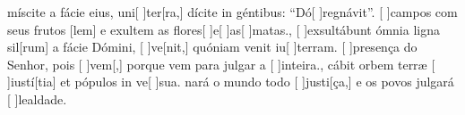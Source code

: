 {  {míscite a fácie eius, uni[ ]{ter}[ra,] dícite in géntibus: ``Dó[ ]{re}{gná}vit''.}%
    {[ ]{cam}pos com seus frutos [lem] e exultem as flores[ ]{e}[ ]{as}[ ]{ma}tas.},
  {[ ]{ex}sultábunt ómnia ligna sil[rum] a fácie Dómini, [ ]{ve}[nit,] quóniam venit iu[ ]{ter}ram.}%
    {[ ]{pre}sença do Senhor, pois [ ]{vem}[,] porque vem para julgar a [ ]{in}{tei}ra.},
  {cábit orbem terræ [ ]{iu}{stí}[tia] et pópulos in ve[ ]{su}a.}%
    {nará o mundo todo [ ]{jus}{ti}[ça,] e os povos julgará [ ]{le}{al}{da}de.}
}